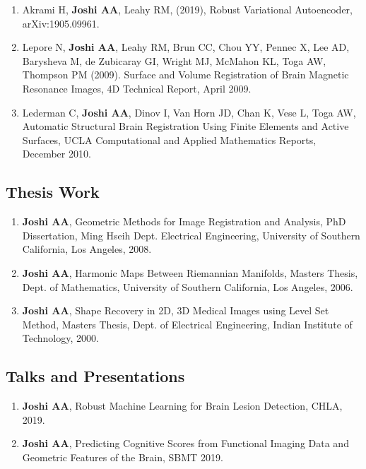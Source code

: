 \documentclass[overlapped,line,letterpaper]{res}
\begin{document}
\begin{resume}
\begin{enumerate}
    \item Akrami H, \textbf{Joshi AA}, Leahy RM, (2019), Robust Variational Autoencoder, arXiv:1905.09961.
    
    \item Lepore N, \textbf{Joshi AA}, Leahy RM, Brun CC, Chou YY, Pennec X, Lee AD, Barysheva M, de Zubicaray GI, Wright MJ, McMahon KL, Toga AW, Thompson PM (2009). Surface and Volume Registration of Brain Magnetic Resonance Images, 4D Technical Report, April 2009.

    \item Lederman C, \textbf{Joshi AA}, Dinov I, Van Horn JD, Chan K, Vese L, Toga AW, Automatic Structural Brain Registration Using Finite Elements and Active Surfaces, UCLA Computational and Applied Mathematics Reports, December 2010. 

\end{enumerate}


\subsection{Thesis Work}
\begin{enumerate}
    \item \textbf{Joshi AA}, Geometric Methods for Image Registration and Analysis, PhD Dissertation, Ming Hseih Dept. Electrical Engineering, University of Southern California, Los Angeles, 2008.

    \item \textbf{Joshi AA}, Harmonic Maps Between Riemannian Manifolds, Masters Thesis, Dept. of Mathematics, University of Southern California, Los Angeles, 2006.

    \item \textbf{Joshi AA}, Shape Recovery in 2D, 3D Medical Images using Level Set Method, Masters Thesis, Dept. of Electrical Engineering, Indian Institute of Technology, 2000.

\end{enumerate}

\subsection{Talks and Presentations}
\begin{enumerate}

    \item \textbf{Joshi AA}, Robust Machine Learning for Brain Lesion Detection, CHLA, 2019. 

    \item \textbf{Joshi AA}, Predicting Cognitive Scores from Functional Imaging Data and Geometric Features of the Brain, SBMT 2019.


\end{enumerate}
\end{resume}
\end{document}
